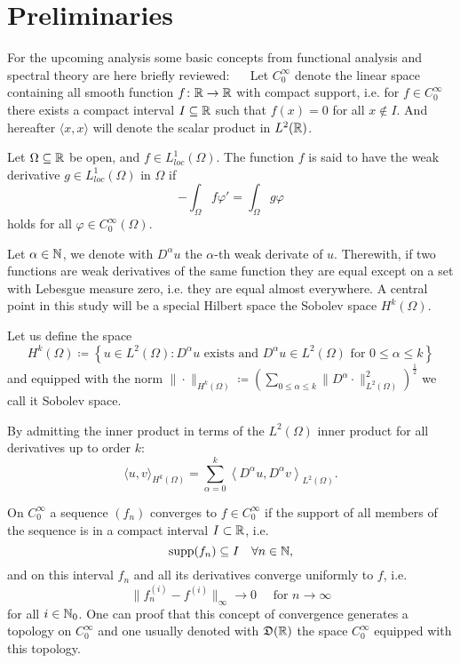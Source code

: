 \chapter{Preliminaries}

For the upcoming analysis some basic concepts from functional analysis and spectral theory are here briefly reviewed:
~\newline ~\newline
Let $C_{0}^{\infty}$ denote the linear space containing all smooth function $f \colon \mathbb{R} \rightarrow \mathbb{R}$ with compact support, i.e. for $f \in C_{0}^{\infty}$ there exists a compact interval $I \subseteq \mathbb{R}$ such that $f(x) = 0$ for all $x \notin I$. And hereafter $\langle x, x \rangle$ will denote the scalar product in $L^{2}(\mathbb{R})$.
\begin{definition}
Let $\Omega \subseteq \mathbb{R}$ be open, and $f \in L^{1}_{loc}(\Omega)$. The function $f$ is said to have the weak derivative $g \in L^{1}_{loc}(\Omega)$ in $\Omega$ if
  \[ - \int_{\Omega} f \varphi' = \int_{\Omega} g \varphi \]
holds for all $\varphi \in C_{0}^{\infty}(\Omega)$.
\end{definition}
Let $\alpha \in \mathbb{N}$, we denote with $D^{\alpha} u$ the $\alpha$-th weak derivate of $u$. Therewith, if two functions are weak derivatives of the same function they are equal except on a set with Lebesgue measure zero, i.e. they are equal almost everywhere. A central point in this study will be a special Hilbert space the Sobolev space $H^{k}(\Omega)$. %
\begin{definition} Let us define the space
\[ H^{k}(\Omega) \coloneqq \left\{ u \in L^{2}(\Omega) : D^{\alpha} u \text{ exists and } D^{\alpha} u \in L^{2}(\Omega) \text{ for } 0 \leq \alpha \leq k \right\} \]
and equipped with the norm $\| \cdot \|_{H^{k}(\Omega)} \coloneqq \left( \sum_{0 \leq \alpha \leq k} \| D^{\alpha} \cdot \|_{L^{2}(\Omega)}^{2} \right)^{\frac{1}{2}}$ we call it Sobolev space.
\end{definition}
By admitting the inner product in terms of the $L^{2}(\Omega)$ inner product for all derivatives up to order $k$: 
	\[ \langle u , v \rangle_{H^{k}(\Omega)} = \sum_{\alpha=0}^{k} \left\langle D^{\alpha}u , D^{\alpha} v \right\rangle_{L^{2}(\Omega)}. \] 	

\begin{definition}[Distributions]
	On $C_{0}^{\infty}$ a sequence $(f_{n})$ converges to $f \in C_{0}^{\infty}$ if the support of all members of the sequence is in a compact interval $I \subset \mathbb{R}$, i.e.
	$$ \operatorname{supp} (f_{n}) \subseteq I \quad \forall n \in \mathbb{N}, $$
	and on this interval $f_{n}$ and all its derivatives converge uniformly to $f$, i.e.
	\[ \| f_{n}^{(i)} - f^{(i)} \|_{\infty} \rightarrow 0 \quad \text{ for } n \rightarrow \infty \]
	for all $i \in \mathbb{N}_{0}$. One can proof that this concept of convergence generates a topology on $C_{0}^{\infty}$ and one usually denoted with $\mathfrak{D}(\mathbb{R})$ the space $C_{0}^{\infty}$ equipped with this topology. %
\end{definition}

